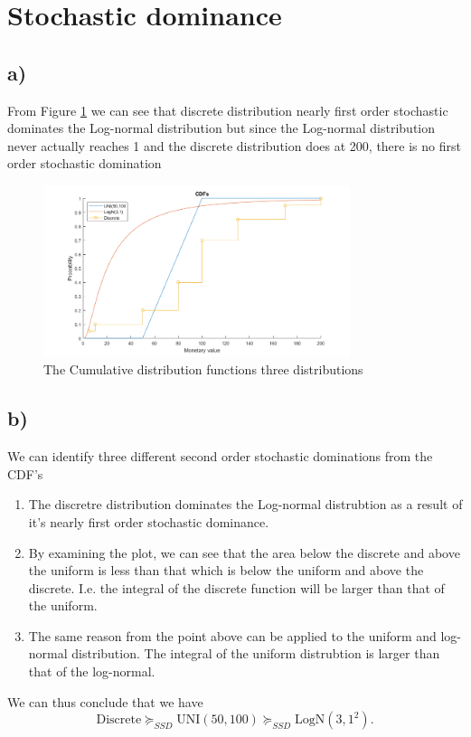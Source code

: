 \documentclass{article}
\begin{document}
\section{Stochastic dominance}
\subsection{a)}
	From Figure \ref{fig:5} we can see that discrete distribution nearly first order stochastic dominates the Log-normal distribution but since the Log-normal distribution never actually reaches 1 and the discrete distribution does at 200, there is no first order stochastic domination
	
	\begin{figure}[H]
		\includegraphics[width=0.8\textwidth]{5.png}
		\caption{The Cumulative distribution functions three distributions}
		\label{fig:5}
	\end{figure}
\subsection{b)}
	We can identify three different second order stochastic dominations from the CDF's
	\begin{enumerate}
		\item The discretre distribution dominates the Log-normal distrubtion as a result of it's nearly first order stochastic dominance.
		\item By examining the plot, we can see that the area below the discrete and above the uniform is less than that which is below the uniform and above the discrete. I.e. the integral of the discrete function will be larger than that of the uniform.
		\item  The same reason from the point above can be applied to the uniform and log-normal distribution. The integral of the uniform distrubtion is larger than that of the log-normal.
	\end{enumerate}
		We can thus conclude that we have
		\begin{equation}
			\text{Discrete} \succcurlyeq_{SSD} \text{UNI}(50,100) \succcurlyeq_{SSD} \text{LogN}(3,1^2).
		\end{equation}
\end{document}
